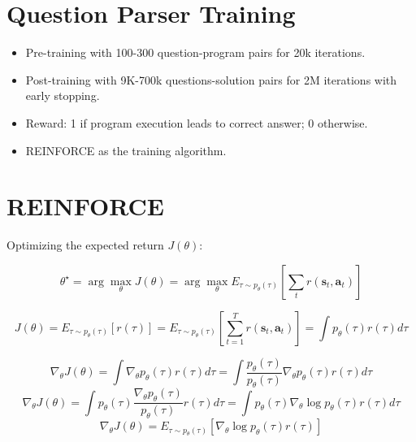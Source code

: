 \documentclass{article}
\begin{document}
\section*{Question Parser Training}

\begin{itemize}
    \item Pre-training with 100-300 question-program pairs for 20k iterations.
    \item Post-training with 9K-700k questions-solution pairs for 2M iterations with early stopping.
    \item Reward: 1 if program execution leads to correct answer; 0 otherwise.
    \item REINFORCE as the training algorithm.
\end{itemize}

\section*{REINFORCE}

Optimizing the expected return \( J(\theta) \):

\begin{equation}
\theta^{\star} = \arg \max_{\theta} J(\theta) = \arg \max_{\theta} E_{\tau \sim p_{\theta}(\tau)} \left[ \sum_{t} r(\mathbf{s}_{t}, \mathbf{a}_{t}) \right]
\end{equation}

\begin{equation}
J(\theta) = E_{\tau \sim p_{\theta}(\tau)} [r(\tau)] = E_{\tau \sim p_{\theta}(\tau)} [\sum_{t=1}^{T} r(\mathbf{s}_{t}, \mathbf{a}_{t})] = \int p_{\theta}(\tau) r(\tau) d\tau
\end{equation}

\begin{equation}
\nabla_{\theta} J(\theta) = \int \nabla_{\theta} p_{\theta}(\tau) r(\tau) d\tau = \int \frac{p_{\theta}(\tau)}{p_{\theta}(\tau)} \nabla_{\theta} p_{\theta}(\tau) r(\tau) d\tau
\end{equation}
\begin{equation}
\nabla_{\theta} J(\theta) = \int p_{\theta}(\tau) \frac{\nabla_{\theta} p_{\theta}(\tau)}{p_{\theta}(\tau)}  r(\tau) d\tau = \int p_{\theta}(\tau) \nabla_{\theta} \log p_{\theta}(\tau) r(\tau) d\tau 
\end{equation}
\begin{equation}
\nabla_{\theta} J(\theta) = E_{\tau \sim p_{\theta}(\tau)} \left[ \nabla_{\theta} \log p_{\theta}(\tau) r(\tau) \right]
\end{equation}
\end{document}
